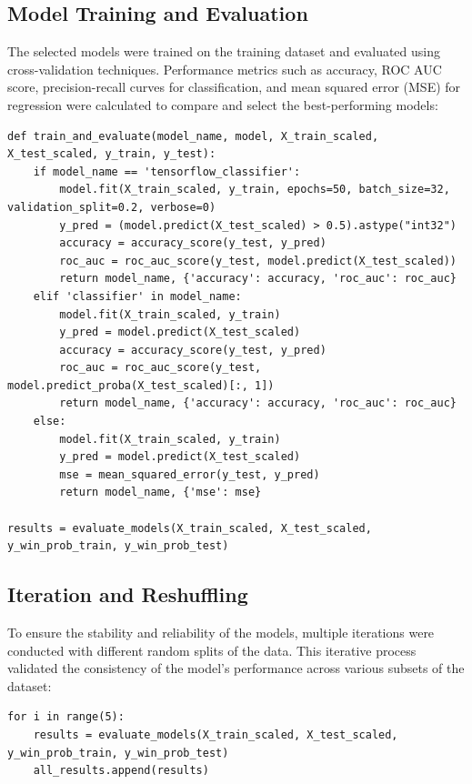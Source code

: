 \documentclass{article}
\begin{document}
\subsection*{Model Training and Evaluation}
The selected models were trained on the training dataset and evaluated using cross-validation techniques. Performance metrics such as accuracy, ROC AUC score, precision-recall curves for classification, and mean squared error (MSE) for regression were calculated to compare and select the best-performing models:
\begin{verbatim}
def train_and_evaluate(model_name, model, X_train_scaled, X_test_scaled, y_train, y_test):
    if model_name == 'tensorflow_classifier':
        model.fit(X_train_scaled, y_train, epochs=50, batch_size=32, validation_split=0.2, verbose=0)
        y_pred = (model.predict(X_test_scaled) > 0.5).astype("int32")
        accuracy = accuracy_score(y_test, y_pred)
        roc_auc = roc_auc_score(y_test, model.predict(X_test_scaled))
        return model_name, {'accuracy': accuracy, 'roc_auc': roc_auc}
    elif 'classifier' in model_name:
        model.fit(X_train_scaled, y_train)
        y_pred = model.predict(X_test_scaled)
        accuracy = accuracy_score(y_test, y_pred)
        roc_auc = roc_auc_score(y_test, model.predict_proba(X_test_scaled)[:, 1])
        return model_name, {'accuracy': accuracy, 'roc_auc': roc_auc}
    else:
        model.fit(X_train_scaled, y_train)
        y_pred = model.predict(X_test_scaled)
        mse = mean_squared_error(y_test, y_pred)
        return model_name, {'mse': mse}

results = evaluate_models(X_train_scaled, X_test_scaled, y_win_prob_train, y_win_prob_test)
\end{verbatim}

\subsection*{Iteration and Reshuffling}
To ensure the stability and reliability of the models, multiple iterations were conducted with different random splits of the data. This iterative process validated the consistency of the model's performance across various subsets of the dataset:
\begin{verbatim}
for i in range(5):
    results = evaluate_models(X_train_scaled, X_test_scaled, y_win_prob_train, y_win_prob_test)
    all_results.append(results)
\end{verbatim}
\end{document}
